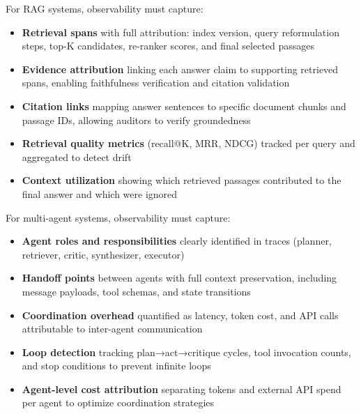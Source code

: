 \begin{tcolorbox}[
  title={\textbf{RAG Systems: Observability Requirements}},
  colback=blue!5,
  colframe=blue!40!black,
  colbacktitle=blue!20,
  coltitle=black,
  fonttitle=\bfseries,
  boxrule=0.7pt,
  arc=4pt,
  left=5mm, right=5mm, top=4mm, bottom=4mm,
  before skip=6pt,
  after skip=6pt
]
\small
For RAG systems, observability must capture:
\begin{itemize}[leftmargin=1.5em, itemsep=3pt]
    \item \textbf{Retrieval spans} with full attribution: index version, query reformulation steps, top-K candidates, re-ranker scores, and final selected passages
    \item \textbf{Evidence attribution} linking each answer claim to supporting retrieved spans, enabling faithfulness verification and citation validation
    \item \textbf{Citation links} mapping answer sentences to specific document chunks and passage IDs, allowing auditors to verify groundedness
    \item \textbf{Retrieval quality metrics} (recall@K, MRR, NDCG) tracked per query and aggregated to detect drift
    \item \textbf{Context utilization} showing which retrieved passages contributed to the final answer and which were ignored
\end{itemize}
\end{tcolorbox}

\begin{tcolorbox}[
  title={\textbf{Multi-Agent Systems: Observability Requirements}},
  colback=purple!5,
  colframe=purple!40!black,
  colbacktitle=purple!20,
  coltitle=black,
  fonttitle=\bfseries,
  boxrule=0.7pt,
  arc=4pt,
  left=5mm, right=5mm, top=4mm, bottom=4mm,
  before skip=6pt,
  after skip=6pt
]
\small
For multi-agent systems, observability must capture:
\begin{itemize}[leftmargin=1.5em, itemsep=3pt]
    \item \textbf{Agent roles and responsibilities} clearly identified in traces (planner, retriever, critic, synthesizer, executor)
    \item \textbf{Handoff points} between agents with full context preservation, including message payloads, tool schemas, and state transitions
    \item \textbf{Coordination overhead} quantified as latency, token cost, and API calls attributable to inter-agent communication
    \item \textbf{Loop detection} tracking plan→act→critique cycles, tool invocation counts, and stop conditions to prevent infinite loops
    \item \textbf{Agent-level cost attribution} separating tokens and external API spend per agent to optimize coordination strategies
\end{itemize}
\end{tcolorbox}

